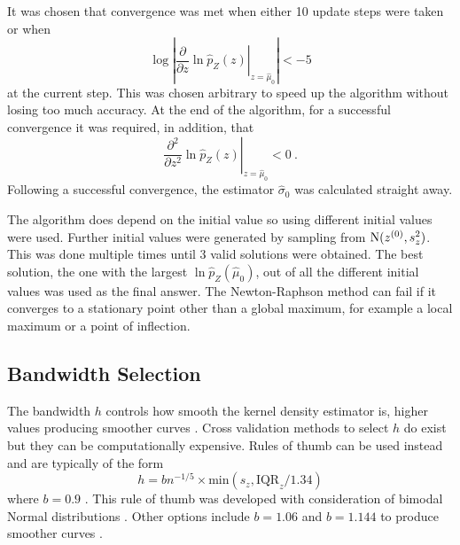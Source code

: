 It was chosen that convergence was met when either 10 update steps were taken or when
\begin{equation}
  \log\left|
    \left.
    \dfrac{
      \partial
    }
    {
      \partial z
    }
  \ln\widehat{p}_Z(z)
  \right|_{z=\widehat{\mu}_0}
  \right|
  <-5
\end{equation}
at the current step. This was chosen arbitrary to speed up the algorithm without losing too much accuracy. At the end of the algorithm, for a successful convergence it was required, in addition, that
\begin{equation}
  \left.
    \dfrac{
      \partial^2
    }
    {
      \partial z^2
    }
    \ln\widehat{p}_Z(z)
  \right|_{z=\widehat{\mu}_0}
  < 0 \ .
\end{equation}
Following a successful convergence, the estimator $\widehat{\sigma}_0$ was calculated straight away.

The algorithm does depend on the initial value so using different initial values were used. Further initial values were generated by sampling from $\operatorname{N}(z^{(0)}, s_z^2)$. This was done multiple times until 3 valid solutions were obtained. The best solution, the one with the largest $\ln\widehat{p}_Z\left(\widehat{\mu}_0\right)$, out of all the different initial values was used as the final answer. The Newton-Raphson method can fail if it converges to a stationary point other than a global maximum, for example a local maximum or a point of inflection. 

\subsection{Bandwidth Selection}

The bandwidth $h$ controls how smooth the kernel density estimator is, higher values producing smoother curves \citep{friedman2001elements}. Cross validation methods to select $h$ do exist \citep{bowman1984alternative, sheather2004density} but they can be computationally expensive. Rules of thumb \citep{silverman1986density, sheather2004density} can be used instead and are typically of the form
\begin{equation}
  h = bn^{-1/5}\times\text{min}\left(s_z,\text{IQR}_z/1.34\right)
\end{equation}
where $b=0.9$ \citep{silverman1986density}. This rule of thumb was developed with consideration of bimodal Normal distributions \citep{silverman1986density}. Other options include $b=1.06$ and $b=1.144$ to produce smoother curves \citep{silverman1986density, sheather2004density}.

